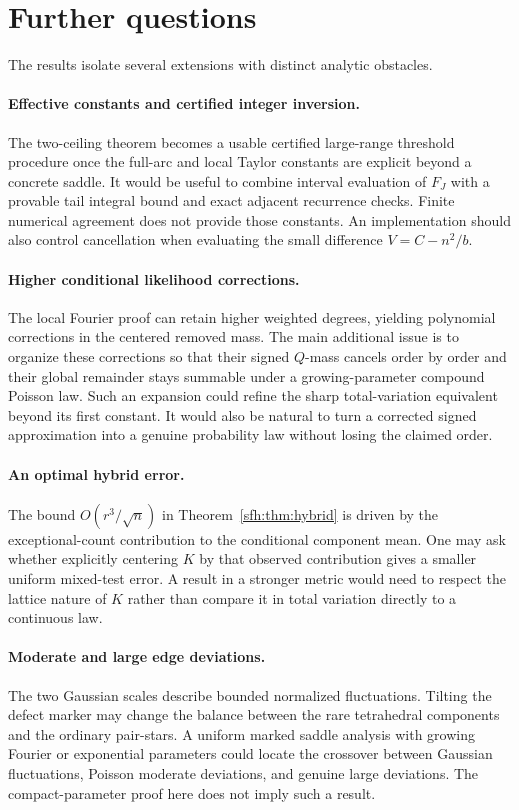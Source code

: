 \section{Further questions}\label{sfh:sec:questions}
The results isolate several extensions with distinct analytic obstacles.

\paragraph{Effective constants and certified integer inversion.}
The two-ceiling theorem becomes a usable certified large-range threshold procedure once the full-arc and local Taylor constants are explicit beyond a concrete saddle. It would be useful to combine interval evaluation of $F_J$ with a provable tail integral bound and exact adjacent recurrence checks. Finite numerical agreement does not provide those constants. An implementation should also control cancellation when evaluating the small difference $V=C-n^2/b$.

\paragraph{Higher conditional likelihood corrections.}
The local Fourier proof can retain higher weighted degrees, yielding polynomial corrections in the centered removed mass. The main additional issue is to organize these corrections so that their signed $Q$-mass cancels order by order and their global remainder stays summable under a growing-parameter compound Poisson law. Such an expansion could refine the sharp total-variation equivalent beyond its first constant. It would also be natural to turn a corrected signed approximation into a genuine probability law without losing the claimed order.

\paragraph{An optimal hybrid error.}
The bound $O(r^3/\sqrt n)$ in Theorem~\ref{sfh:thm:hybrid} is driven by the exceptional-count contribution to the conditional component mean. One may ask whether explicitly centering $K$ by that observed contribution gives a smaller uniform mixed-test error. A result in a stronger metric would need to respect the lattice nature of $K$ rather than compare it in total variation directly to a continuous law.

\paragraph{Moderate and large edge deviations.}
The two Gaussian scales describe bounded normalized fluctuations. Tilting the defect marker may change the balance between the rare tetrahedral components and the ordinary pair-stars. A uniform marked saddle analysis with growing Fourier or exponential parameters could locate the crossover between Gaussian fluctuations, Poisson moderate deviations, and genuine large deviations. The compact-parameter proof here does not imply such a result.

